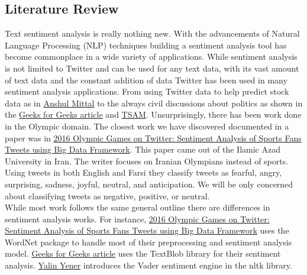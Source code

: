 \documentclass[12pt]{article}
\begin{document}
        \subsection{Literature Review}
            Text sentiment analysis is really nothing new. With the advancements of Natural Language Processing (NLP) techniques building a sentiment analysis tool has become commonplace
            in a wide variety of applications. While sentiment analysis is not limited to Twitter and can be used for any text data, with its vast amount of text data and the constant
            addition of data Twitter has been used in many sentiment analysis applications. From using Twitter data to help predict stock data as in 
            \href{http://cs229.stanford.edu/proj2011/GoelMittal-StockMarketPredictionUsingTwitterSentimentAnalysis.pdf}{Anshul Mittal} to the always civil discussions about politics as
            shown in the \href{https://www.geeksforgeeks.org/twitter-sentiment-analysis-using-python/}{Geeks for Geeks article} and 
            \href{https://ieeexplore.ieee.org/abstract/document/6581022?casa_token=qrfkpDZP30sAAAAA:PNpsFf2_T9jXUB81SKLMldZji2tDprsCz4Ec4QSrHxlJQNIW3Yi52tWHZ4jhfTgPrqRjzjdKBfA}{TSAM}. 
            Unsurprisingly, there has been work done in the Olympic domain. The closest work we have discovered documented in a paper was in 
            \href{https://raw.githubusercontent.com/cvorsanger/COMP-4447-Final-Project/master/Literature%20Review/JACET_Volume%205_Issue%203_Page%20143-160.pdf}{2016 Olympic Games on Twitter: Sentiment Analysis of Sports Fans Tweets using Big Data Framework}.
            This paper came out of the Ilamic Azad University in Iran. The writer focuses on Iranian Olympians instead of sports. Using tweets in both English and Farsi they classify
            tweets as fearful, angry, surprising, sadness, joyful, neutral, and anticipation. We will be only concerned about classifying tweets as negative, positive, or neutral.\\

            While most work follows the same general outline there are differences in sentiment analysis works. For instance,
            \href{https://raw.githubusercontent.com/cvorsanger/COMP-4447-Final-Project/master/Literature%20Review/JACET_Volume%205_Issue%203_Page%20143-160.pdf}{2016 Olympic Games on Twitter: Sentiment Analysis of Sports Fans Tweets using Big Data Framework}
            uses the WordNet package to handle most of their preprocessing and sentiment analysis model. 
            \href{https://www.geeksforgeeks.org/twitter-sentiment-analysis-using-python/}{Geeks for Geeks article} uses the TextBlob library for their sentiment analysis. 
            \href{https://towardsdatascience.com/step-by-step-twitter-sentiment-analysis-in-python-d6f650ade58d}{Yalin Yener} introduces the Vader sentiment engine in the nltk library.\\
\end{document}
